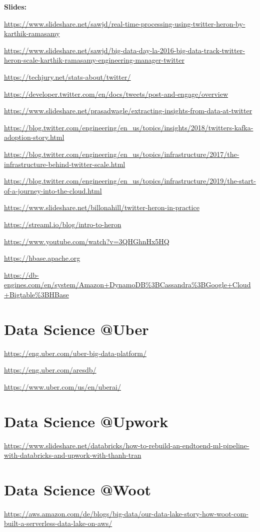 \documentclass[12pt, numbers=noenddot]{scrreprt} %
\begin{document}
\textbf{Slides:}

\url{https://www.slideshare.net/sawjd/real-time-processing-using-twitter-heron-by-karthik-ramasamy}

\url{https://www.slideshare.net/sawjd/big-data-day-la-2016-big-data-track-twitter-heron-scale-karthik-ramasamy-engineering-manager-twitter}

\url{https://techjury.net/stats-about/twitter/}

\url{https://developer.twitter.com/en/docs/tweets/post-and-engage/overview}

\url{https://www.slideshare.net/prasadwagle/extracting-insights-from-data-at-twitter}

\url{https://blog.twitter.com/engineering/en_us/topics/insights/2018/twitters-kafka-adoption-story.html}

\url{https://blog.twitter.com/engineering/en_us/topics/infrastructure/2017/the-infrastructure-behind-twitter-scale.html}

\url{https://blog.twitter.com/engineering/en_us/topics/infrastructure/2019/the-start-of-a-journey-into-the-cloud.html}

\url{https://www.slideshare.net/billonahill/twitter-heron-in-practice}

\url{https://streaml.io/blog/intro-to-heron}

\url{https://www.youtube.com/watch?v=3QHGhnHx5HQ}

\url{https://hbase.apache.org}

\url{https://db-engines.com/en/system/Amazon+DynamoDB%3BCassandra%3BGoogle+Cloud+Bigtable%3BHBase}


\section{Data Science @Uber}
\url{https://eng.uber.com/uber-big-data-platform/}

\url{https://eng.uber.com/aresdb/}

\url{https://www.uber.com/us/en/uberai/}

\section{Data Science @Upwork}
\url{https://www.slideshare.net/databricks/how-to-rebuild-an-endtoend-ml-pipeline-with-databricks-and-upwork-with-thanh-tran}

\section{Data Science @Woot}
\url{https://aws.amazon.com/de/blogs/big-data/our-data-lake-story-how-woot-com-built-a-serverless-data-lake-on-aws/}
\end{document}
